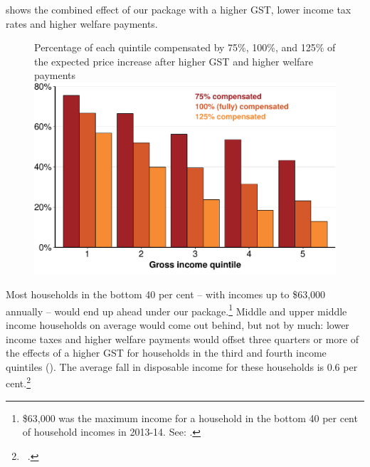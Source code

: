  shows the combined effect of our package with a higher GST, lower income tax rates and higher welfare payments.

\begin{figure}[!t]
%
{Percentage of each quintile compensated by 75\%, 100\%, and 125\% of the expected price increase after higher GST and higher welfare payments}
\includegraphics[width=\columnwidth]{atlas/figure/GST-Figure-9-1.pdf}

\end{figure}

Most households in the bottom 40 per cent – with incomes up to \$63,000 annually – would end up ahead under our package.\footnote{\$63,000 was the maximum income for a household in the bottom 40 per cent of household incomes in 2013-14. See: \textcite{ABS2015HouseholdIncomeWealth1314}.} Middle and upper middle income households on average would come out behind, but not by much: lower income taxes and higher welfare payments would offset three quarters or more of the effects of a higher GST for households in the third and fourth income quintiles (). The average fall in disposable income for these households is 0.6 per cent.\footnote{\gao\ \textcite{ABS2013-HES-2011-12-CURF}.}  


